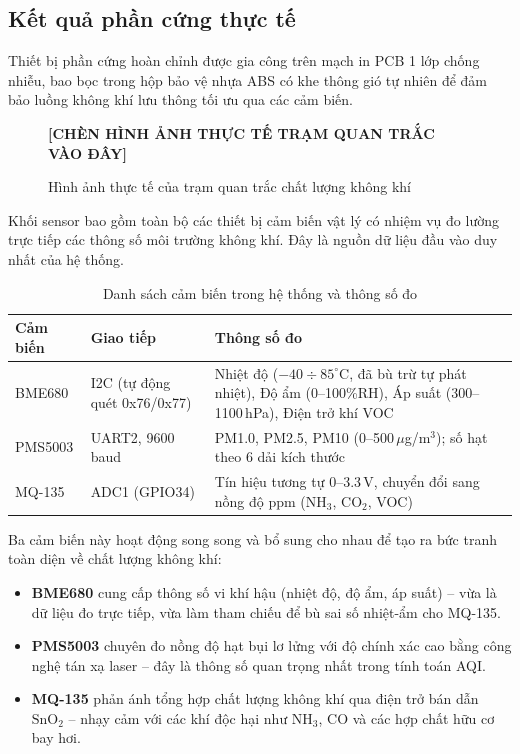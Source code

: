 \documentclass[12pt,a4paper]{article}
\begin{document}
\subsection{Kết quả phần cứng thực tế}

Thiết bị phần cứng hoàn chỉnh được gia công trên mạch in PCB 1 lớp chống nhiễu, bao bọc trong hộp bảo vệ nhựa ABS có khe thông gió tự nhiên để đảm bảo luồng không khí lưu thông tối ưu qua các cảm biến.

\begin{figure}[H]
    \centering
    \textbf{[CHÈN HÌNH ẢNH THỰC TẾ TRẠM QUAN TRẮC VÀO ĐÂY]}
    \caption{Hình ảnh thực tế của trạm quan trắc chất lượng không khí}
    \label{fig:hardware_real}
\end{figure}

Khối sensor bao gồm toàn bộ các thiết bị cảm biến vật lý có nhiệm vụ đo lường trực tiếp các thông số môi trường không khí. Đây là nguồn dữ liệu đầu vào duy nhất của hệ thống.

\begin{table}[H]
\centering
\caption{Danh sách cảm biến trong hệ thống và thông số đo}
\label{tab:sensor_block}
\begin{tabularx}{\textwidth}{|l|l|>{\raggedright\arraybackslash}X|}
\hline
\textbf{Cảm biến} & \textbf{Giao tiếp} & \textbf{Thông số đo} \\ 
\hline
BME680  & I2C (tự động quét 0x76/0x77) & Nhiệt độ ($-40 \div 85^\circ$C, đã bù trừ tự phát nhiệt), Độ ẩm (0--100\%RH), Áp suất (300--1100\,hPa), Điện trở khí VOC \\ 
\hline
PMS5003 & UART2, 9600 baud & PM1.0, PM2.5, PM10 (0--500\,$\mu$g/m$^3$); số hạt theo 6 dải kích thước \\ 
\hline
MQ-135  & ADC1 (GPIO34) & Tín hiệu tương tự 0--3.3\,V, chuyển đổi sang nồng độ ppm (NH$_3$, CO$_2$, VOC) \\ 
\hline
\end{tabularx}
\end{table}

Ba cảm biến này hoạt động song song và bổ sung cho nhau để tạo ra bức tranh toàn diện về chất lượng không khí:
\begin{itemize}
    \item \textbf{BME680} cung cấp thông số vi khí hậu (nhiệt độ, độ ẩm, áp suất) -- vừa là dữ liệu đo trực tiếp, vừa làm tham chiếu để bù sai số nhiệt-ẩm cho MQ-135.
    \item \textbf{PMS5003} chuyên đo nồng độ hạt bụi lơ lửng với độ chính xác cao bằng công nghệ tán xạ laser -- đây là thông số quan trọng nhất trong tính toán AQI.
    \item \textbf{MQ-135} phản ánh tổng hợp chất lượng không khí qua điện trở bán dẫn $\text{SnO}_2$ -- nhạy cảm với các khí độc hại như NH$_3$, CO và các hợp chất hữu cơ bay hơi.
\end{itemize}
\end{document}
